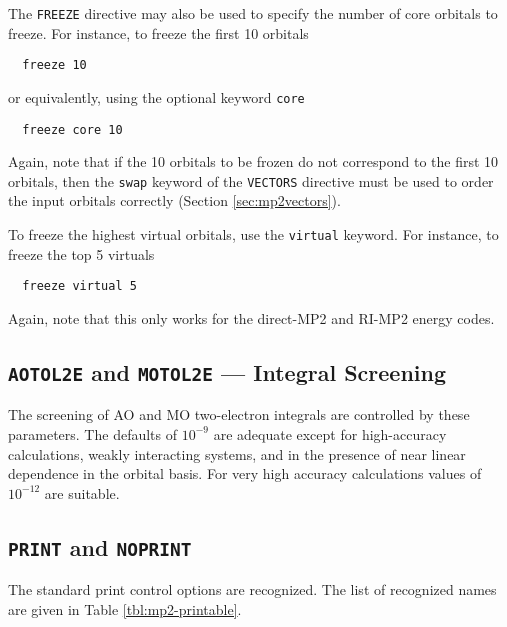 The \verb+FREEZE+ directive may also be used to specify the number of 
core orbitals to freeze.  For instance, to freeze the first 10 orbitals
\begin{verbatim}
  freeze 10
\end{verbatim}
or equivalently, using the optional keyword \verb+core+
\begin{verbatim}
  freeze core 10
\end{verbatim}
Again, note that if the 10 orbitals to be frozen do not correspond to
the first 10 orbitals, then the \verb+swap+ keyword of the
\verb+VECTORS+ directive must be used to order the input orbitals
correctly (Section \ref{sec:mp2vectors}).

To freeze the highest virtual orbitals, use the \verb+virtual+
keyword.  For instance, to freeze the top 5 virtuals
\begin{verbatim}
  freeze virtual 5
\end{verbatim}
Again, note that this only works for the direct-MP2 and RI-MP2 energy
codes.

\subsection{{\tt AOTOL2E} and {\tt MOTOL2E} --- Integral Screening}

The screening of AO and MO two-electron integrals are controlled by
these parameters.  The defaults of $10^{-9}$ are adequate except for
high-accuracy calculations, weakly interacting systems, and in the
presence of near linear dependence in the orbital basis.  For very
high accuracy calculations values of $10^{-12}$ are suitable.

\subsection{{\tt PRINT} and {\tt NOPRINT}}

The standard print control options are recognized.  The list of
recognized names are given in Table \ref{tbl:mp2-printable}.

